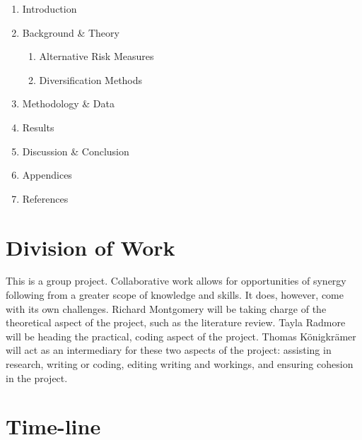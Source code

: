 \documentclass[12pt,a4paper]{article}
\newcommand{\be}{\begin{enumerate}}
\newcommand{\ee}{\end{enumerate}}
\begin{document}
\be
\item Introduction
\item Background \& Theory
	\be
	\item Alternative Risk Measures
	\item Diversification Methods
	\ee
\item Methodology \& Data
\item Results
\item Discussion \& Conclusion
\item Appendices %
\item References
\ee
 
\section{Division of Work}
\label{sec:dow} 

This is a group project. Collaborative work allows for opportunities of synergy following from a greater scope of knowledge and skills. It does, however, come with its own challenges. Richard Montgomery will be taking charge of the theoretical aspect of the project, such as the literature review. Tayla Radmore will be heading the practical, coding aspect of the project. Thomas K{\"o}nigkr{\"a}mer will act as an intermediary for these two aspects of the project: assisting in research, writing or coding, editing writing and workings, and ensuring cohesion in the project.

\section{Time-line}
\label{sec:time}
\end{document}
